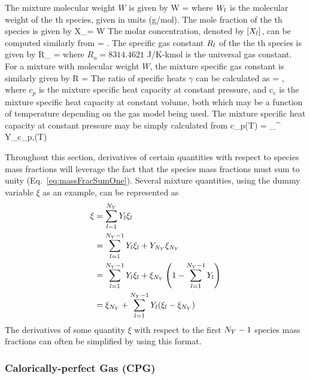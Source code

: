The mixture molecular weight $W$ is given by
\be
    W = 
\ee
where $W_{l}$ is the molecular weight of the \speciesIdx th species, given in units (g/mol). The mole fraction of the \speciesIdx th species is given by
\be
    X_\speciesIdx = W 
\ee
The molar concentration, denoted by $[X_{l}]$, can be computed similarly from 
\be
    [X_\speciesIdx] = \rho {}.
\ee
The specific gas constant $R_{l}$ of the the \speciesIdx th species is given by
\be
    R_{\speciesIdx} = 
\ee
where $R_u = 8314.4621$ J/K-kmol is the universal gas constant. For a mixture with molecular weight $W$, the mixture specific gas constant is similarly given by
\be
    R = 
\ee
The ratio of specific heats $\gamma$ can be calculated as 
\be
    \gamma = ,
\ee    
where $c_p$ is the mixture specific heat capacity at constant pressure, and $c_v$ is the mixture specific heat capacity at constant volume, both which may be a function of temperature depending on the gas model being used. The mixture specific heat capacity at constant pressure may be simply calculated from
\be
    c_p(T) = \sum_{}^{\numSpecies} Y_\speciesIdx c_{p,\speciesIdx}(T)
\ee

Throughout this section, derivatives of certain quantities with respect to species mass fractions will leverage the fact that the species mass fractions must sum to unity (Eq.~\ref{eq:massFracSumOne}). Several mixture quantities, using the dummy variable $\xi$ as an example, can be represented as 
\begin{align}
    \xi &= \sum_{l=1}^{{N_Y}} Y_{l} \xi_{l} \\
    &= \sum_{l=1}^{{N_Y}-1} Y_{l} \xi_{l} + Y_{{N_Y}} \xi_{{N_Y}} \\
    &= \sum_{l=1}^{{N_Y}-1} Y_{l} \xi_{l} + \xi_{{N_Y}} \left( 1 - \sum_{l=1}^{{N_Y}-1} Y_{l} \right) \\ 
    &= \xi_{{N_Y}} + \sum_{l=1}^{{N_Y}-1} Y_{l} (\xi_{l} - \xi_{{N_Y}})
\end{align}
The derivatives of some quantity $\xi$ with respect to the first ${N_Y}-1$ species mass fractions can often be simplified by using this format.

\subsubsection{Calorically-perfect Gas (CPG)}

